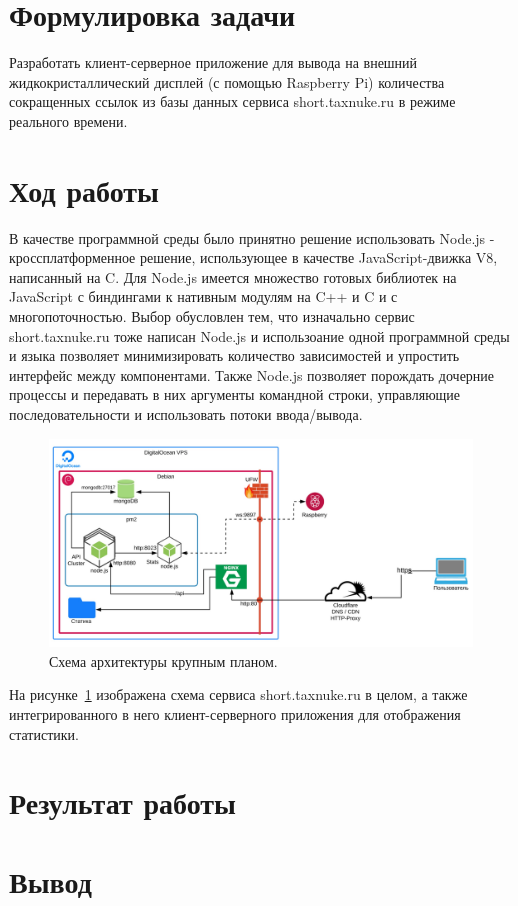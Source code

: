 \documentclass[a4paper, 12pt]{article}
\begin{document}
    

    \newpage

    \section*{Формулировка задачи}
        Разработать клиент-серверное приложение для вывода на внешний жидкокристаллический
        дисплей (с помощью Raspberry Pi) количества сокращенных ссылок из базы данных сервиса short.taxnuke.ru в режиме реального времени.

    \section*{Ход работы}
        В качестве программной среды было принятно решение использовать Node.js - кроссплатформенное решение,
        использующее в качестве JavaScript-движка V8, написанный на C. Для Node.js имеется множество готовых библиотек
        на JavaScript с биндингами к нативным модулям на C++ и C и с многопоточностью.
        Выбор обусловлен тем, что изначально сервис short.taxnuke.ru тоже написан Node.js и использоание
        одной программной среды и языка позволяет минимизировать количество зависимостей и упростить интерфейс между компонентами.
        Также Node.js позволяет порождать дочерние процессы и передавать в них аргументы командной
        строки, управляющие последовательности и использовать потоки ввода/вывода.

        \begin{figure}
            \includegraphics[width=\linewidth]{img/arch.jpg}
            \caption{Схема архитектуры крупным планом.}
            \label{fig:bigarch}
        \end{figure}

        На рисунке~\ref{fig:bigarch} изображена схема сервиса short.taxnuke.ru в целом, а также интегрированного в него
        клиент-серверного приложения для отображения статистики.

    \section*{Результат работы}
    \section*{Вывод}
\end{document}
